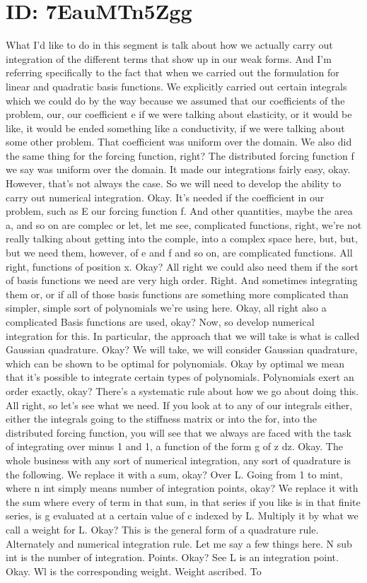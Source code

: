 \documentclass[10pt]{article}
\begin{document}
{\section*{ID: 7EauMTn5Zgg}
What I'd like to do in this segment is talk about how we actually carry out integration of the different terms that show up in our weak forms. And I'm referring specifically to the fact that when we carried out the formulation for linear and quadratic basis functions. We explicitly carried out certain integrals which we could do by the way because we assumed that our coefficients of the problem, our, our coefficient e if we were talking about elasticity, or it would be like, it would be ended something like a conductivity, if we were talking about some other problem. That coefficient was uniform over the domain. We also did the same thing for the forcing function, right? The distributed forcing function f we say was uniform over the domain. It made our integrations fairly easy, okay. However, that's not always the case. So we will need to develop the ability to carry out numerical integration. Okay. It's needed if the coefficient in our problem, such as E our forcing function f. And other quantities, maybe the area a, and so on are complec or let, let me see, complicated functions, right, we're not really talking about getting into the comple, into a complex space here, but, but, but we need them, however, of e and f and so on, are complicated functions. All right, functions of position x. Okay? All right we could also need them if the sort of basis functions we need are very high order. Right. And sometimes integrating them or, or if all of those basis functions are something more complicated than simpler, simple sort of polynomials we're using here. Okay, all right also a complicated Basis functions are used, okay? Now, so develop numerical integration for this. In particular, the approach that we will take is what is called Gaussian quadrature. Okay? We will take, we will consider Gaussian quadrature, which can be shown to be optimal for polynomials. Okay by optimal we mean that it's possible to integrate certain types of polynomials. Polynomials exert an order exactly, okay?  There's a systematic rule about how we go about doing this. All right, so let's see what we need. If you look at to any of our integrals either, either the integrals going to the stiffness matrix or into the for, into the distributed forcing function, you will see that we always are faced with the task of integrating over minus 1 and 1, a function of the form g of z dz. Okay. The whole business with any sort of numerical integration, any sort of quadrature is the following. We replace it with a sum, okay? Over L. Going from 1 to mint, where n int simply means number of integration points, okay? We replace it with the sum where every of term in that sum, in that series if you like is in that finite series, is g evaluated at a certain value of c indexed by L. Multiply it by what we call a weight for L. Okay? This is the general form of a quadrature rule. Alternately and numerical integration rule. Let me say a few things here. N sub int is the number of integration. Points. Okay? See L is an integration point. Okay. Wl is the corresponding weight. Weight ascribed. To }
\end{document}
